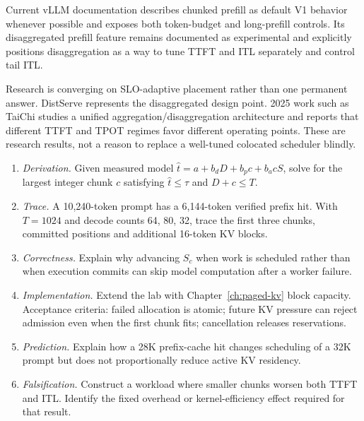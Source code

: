 Current vLLM documentation describes chunked prefill as default V1 behavior whenever
possible and exposes both token-budget and long-prefill controls. Its disaggregated
prefill feature remains documented as experimental and explicitly positions
disaggregation as a way to tune TTFT and ITL separately and control tail ITL.

Research is converging on SLO-adaptive placement rather than one permanent answer.
DistServe represents the disaggregated design point. 2025 work such as TaiChi studies
a unified aggregation/disaggregation architecture and reports that different TTFT and
TPOT regimes favor different operating points. These are research results, not a
reason to replace a well-tuned colocated scheduler blindly.

\ExercisesSection
\begin{enumerate}
\item \emph{Derivation.} Given measured model
$\hat t=a+b_dD+b_pc+b_acS$, solve for the largest integer chunk $c$ satisfying
$\hat t\le\tau$ and $D+c\le T$.
\item \emph{Trace.} A 10,240-token prompt has a 6,144-token verified prefix hit.
With $T=1024$ and decode counts 64, 80, 32, trace the first three chunks, committed
positions and additional 16-token KV blocks.
\item \emph{Correctness.} Explain why advancing $S_c$ when work is scheduled rather
than when execution commits can skip model computation after a worker failure.
\item \emph{Implementation.} Extend the lab with Chapter~\ref{ch:paged-kv} block
capacity. Acceptance criteria: failed allocation is atomic; future KV pressure can
reject admission even when the first chunk fits; cancellation releases reservations.
\item \emph{Prediction.} Explain how a 28K prefix-cache hit changes scheduling of a
32K prompt but does not proportionally reduce active KV residency.
\item \emph{Falsification.} Construct a workload where smaller chunks worsen both
TTFT and ITL. Identify the fixed overhead or kernel-efficiency effect required for
that result.
\end{enumerate}



